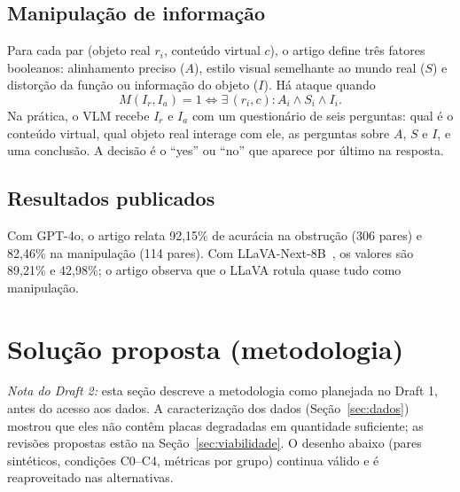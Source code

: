 \documentclass[journal,onecolumn]{IEEEtran}
\newcommand{\Ir}{I_r}
\newcommand{\Ia}{I_a}
\begin{document}
\subsection{Manipulação de informação}
Para cada par (objeto real $r_i$, conteúdo virtual $c$), o artigo define três fatores booleanos:
alinhamento preciso ($A$), estilo visual semelhante ao mundo real ($S$) e distorção da função ou
informação do objeto ($I$). Há ataque quando
\begin{equation}
M(\Ir,\Ia)=1 \iff \exists\, (r_i,c): A_i \wedge S_i \wedge I_i .
\label{eq:man}
\end{equation}
Na prática, o VLM recebe $\Ir$ e $\Ia$ com um questionário de seis perguntas: qual é o conteúdo
virtual, qual objeto real interage com ele, as perguntas sobre $A$, $S$ e $I$, e uma conclusão. A
decisão é o ``yes'' ou ``no'' que aparece por último na resposta.

\subsection{Resultados publicados}
Com GPT-4o, o artigo relata 92,15\% de acurácia na obstrução (306 pares) e 82,46\% na manipulação
(114 pares). Com LLaVA-Next-8B~\cite{llava}, os valores são 89,21\% e 42,98\%; o artigo observa que
o LLaVA rotula quase tudo como manipulação.

\section{Solução proposta (metodologia)}
\label{sec:metodo}

\emph{Nota do Draft 2:} esta seção descreve a metodologia como planejada no Draft 1, antes do acesso
aos dados. A caracterização dos dados (Seção~\ref{sec:dados}) mostrou que eles não contêm placas
degradadas em quantidade suficiente; as revisões propostas estão na Seção~\ref{sec:viabilidade}. O
desenho abaixo (pares sintéticos, condições C0--C4, métricas por grupo) continua válido e é reaproveitado
nas alternativas.
\end{document}

